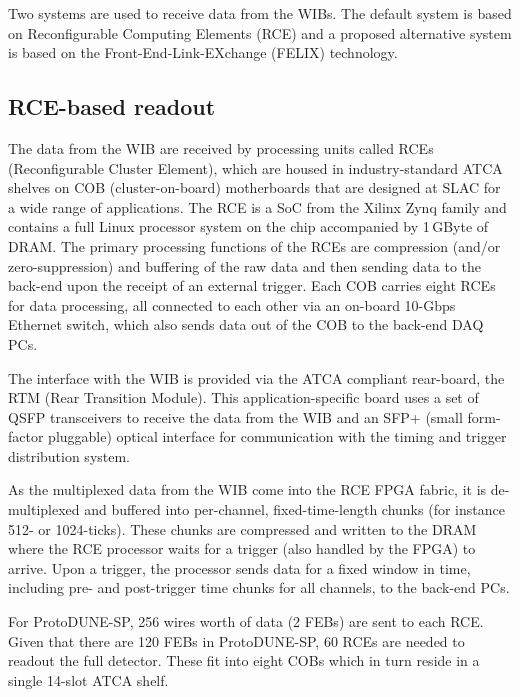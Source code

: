 Two systems are used to receive data from the WIBs.  The default system
 is based on Reconfigurable Computing Elements (RCE) and a proposed alternative system is based on
the Front-End-Link-EXchange (FELIX) technology. 

\subsection{RCE-based readout}
The data from the WIB are received by processing units called RCEs (Reconfigurable Cluster Element), 
\cite{slac:rce}
which are housed in industry-standard
ATCA shelves on COB (cluster-on-board) motherboards that are designed
at SLAC for a wide range of applications.   The RCE is a SoC 
from the
Xilinx Zynq family and contains a full Linux processor system on the chip
accompanied by 1\,GByte of DRAM.   The primary processing functions of the
RCEs are compression (and/or zero-suppression) and buffering
of the raw data and then sending data to the back-end upon the receipt of
an external trigger.  Each COB carries eight RCEs for data processing, all connected to each
other via an on-board 10-Gbps Ethernet switch, which also sends data out
of the COB to the back-end DAQ PCs.

The interface with the WIB is provided via the ATCA compliant rear-board, the RTM (Rear Transition Module).  
This application-specific board uses a set of QSFP transceivers to receive
the data from the WIB and an SFP+ (small form-factor pluggable)
 optical interface for communication
with the timing and trigger distribution system.

As the multiplexed data from the WIB come into the RCE FPGA fabric,
it is de-multiplexed and buffered into per-channel, fixed-time-length 
chunks (for instance 512- or 1024-ticks).  These chunks are
compressed and written to the DRAM where the RCE processor waits
for a trigger (also handled by the FPGA) to arrive.  Upon a trigger, the
processor sends data for a fixed window in time, including pre- and post-trigger time chunks
for all channels, to the back-end PCs.  

For ProtoDUNE-SP, 256 wires worth of data (2 FEBs) are sent to each RCE.
Given that there are 120 FEBs in ProtoDUNE-SP, 60 RCEs are needed to
readout the full detector.  These fit into eight COBs which in turn
reside in a single 14-slot ATCA shelf.

